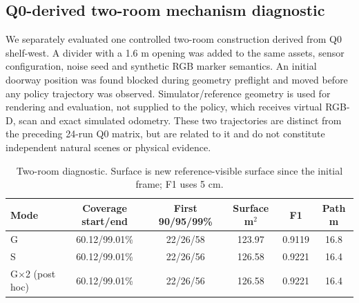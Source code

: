 \subsection{Q0-derived two-room mechanism diagnostic}\label{two-room-diagnostic}

We separately evaluated one controlled two-room construction derived from Q0 shelf-west. A divider with a 1.6 m opening was added to the same assets, sensor configuration, noise seed and synthetic RGB marker semantics. An initial doorway position was found blocked during geometry preflight and moved before any policy trajectory was observed. Simulator/reference geometry is used for rendering and evaluation, not supplied to the policy, which receives virtual RGB-D, scan and exact simulated odometry. These two trajectories are distinct from the preceding 24-run Q0 matrix, but are related to it and do not constitute independent natural scenes or physical evidence.

\begin{table}[!htbp]
\centering
\caption{Two-room diagnostic. Surface is new reference-visible surface since the initial frame; F1 uses 5 cm.}
\label{tab:two-room}
\small
\begin{tabular}{lccccc}
\toprule
Mode & Coverage start/end & First 90/95/99\% & Surface m$^2$ & F1 & Path m \\
\midrule
G & 60.12/99.01\% & 22/26/58 & 123.97 & 0.9119 & 16.8 \\
S & 60.12/99.01\% & 22/26/56 & 126.58 & 0.9221 & 16.4 \\
G$\times$2 (post hoc) & 60.12/99.01\% & 22/26/56 & 126.58 & 0.9221 & 16.4 \\
\bottomrule
\end{tabular}
\end{table}

